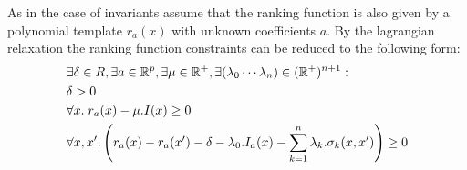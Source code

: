 As in the case of invariants assume that the ranking function is also given by
a polynomial template $r_a(x)$ with unknown coefficients $a$. By the lagrangian
relaxation the ranking function constraints can be reduced to the following form:
%
\begin{align}
& \nonumber \exists \delta \in R, \exists a \in \real^p, \exists \mu \in \real^+, \exists (\lambda_0 \cdots \lambda_n) \in (\real^+)^{n+1} : \\
& \delta > 0 \label{eq:rank1}\\
& \forall x. \; r_a(x) - \mu.I(x)  \ge 0 \label{eq:rank2}\\
& \forall x,x'. \left( r_a(x) - r_a(x') - \delta - \lambda_0.I_a(x) - \sum \limits_{k=1}^{n} \lambda_k. \sigma_k(x,x') \right) \ge 0 \label{eq:rank3}
\end{align}
%



